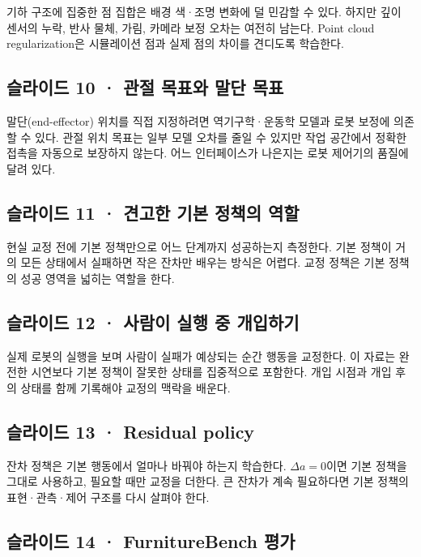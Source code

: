 \documentclass[11pt,a4paper]{article}
\begin{document}
기하 구조에 집중한 점 집합은 배경 색·조명 변화에 덜 민감할 수 있다. 하지만 깊이 센서의 누락, 반사 물체, 가림, 카메라 보정 오차는 여전히 남는다. Point cloud regularization은 시뮬레이션 점과 실제 점의 차이를 견디도록 학습한다.\par

\subsection{슬라이드 10 · 관절 목표와 말단 목표}

말단(end-effector) 위치를 직접 지정하려면 역기구학·운동학 모델과 로봇 보정에 의존할 수 있다. 관절 위치 목표는 일부 모델 오차를 줄일 수 있지만 작업 공간에서 정확한 접촉을 자동으로 보장하지 않는다. 어느 인터페이스가 나은지는 로봇 제어기의 품질에 달려 있다.\par

\subsection{슬라이드 11 · 견고한 기본 정책의 역할}

현실 교정 전에 기본 정책만으로 어느 단계까지 성공하는지 측정한다. 기본 정책이 거의 모든 상태에서 실패하면 작은 잔차만 배우는 방식은 어렵다. 교정 정책은 기본 정책의 성공 영역을 넓히는 역할을 한다.\par

\subsection{슬라이드 12 · 사람이 실행 중 개입하기}

실제 로봇의 실행을 보며 사람이 실패가 예상되는 순간 행동을 교정한다. 이 자료는 완전한 시연보다 기본 정책이 잘못한 상태를 집중적으로 포함한다. 개입 시점과 개입 후의 상태를 함께 기록해야 교정의 맥락을 배운다.\par

\subsection{슬라이드 13 · Residual policy}

잔차 정책은 기본 행동에서 얼마나 바꿔야 하는지 학습한다. $\Delta a=0$이면 기본 정책을 그대로 사용하고, 필요할 때만 교정을 더한다. 큰 잔차가 계속 필요하다면 기본 정책의 표현·관측·제어 구조를 다시 살펴야 한다.\par

\subsection{슬라이드 14 · FurnitureBench 평가}
\end{document}
